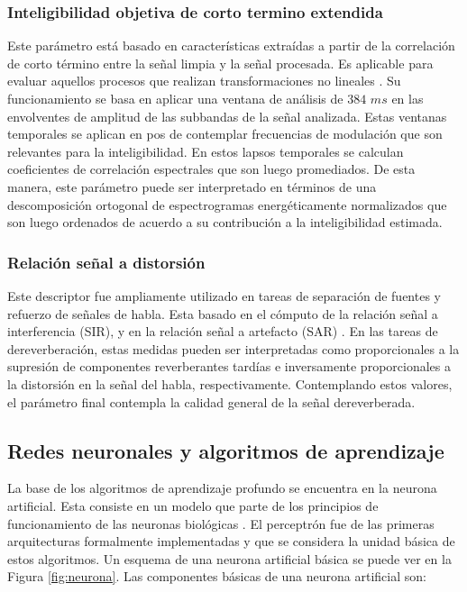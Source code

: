 \subsubsection{Inteligibilidad objetiva de corto termino extendida}
Este parámetro está basado en características extraídas a partir de la correlación de corto término entre la señal limpia y la señal procesada. Es aplicable para evaluar aquellos procesos que realizan transformaciones no lineales \cite{ESTOI}. Su funcionamiento se basa en aplicar una ventana de análisis de $384$ $ms$ en las envolventes de amplitud de las subbandas de la señal analizada. Estas ventanas temporales se aplican en pos de contemplar frecuencias de modulación que son relevantes para la inteligibilidad. En estos lapsos temporales se calculan coeficientes de correlación espectrales que son luego promediados. De esta manera, este parámetro puede ser interpretado en términos de una descomposición ortogonal de espectrogramas energéticamente normalizados que son luego ordenados de acuerdo a su contribución a la inteligibilidad estimada. 

\subsubsection{Relación señal a distorsión}

Este descriptor fue ampliamente utilizado en tareas de separación de fuentes y refuerzo de señales de habla. Esta basado en el cómputo de la relación señal a interferencia (SIR), y en la relación señal a artefacto (SAR) \cite{SAR}. En las tareas de dereverberación, estas medidas pueden ser interpretadas como proporcionales a la supresión de componentes reverberantes tardías e inversamente proporcionales a la distorsión en la señal del habla, respectivamente. Contemplando estos valores, el parámetro final contempla la calidad general de la señal dereverberada.  

\subsection{Redes neuronales y algoritmos de aprendizaje}

La base de los algoritmos de aprendizaje profundo se encuentra en la neurona artificial. Esta consiste en un modelo que parte de los principios de funcionamiento de las neuronas biológicas \cite{neurona}. El perceptrón \cite{perceptron} fue de las primeras arquitecturas formalmente implementadas y que se considera la unidad básica de  estos algoritmos. Un esquema de una neurona artificial básica se puede ver en la Figura \ref{fig:neurona}. Las componentes básicas de una neurona artificial son: 

